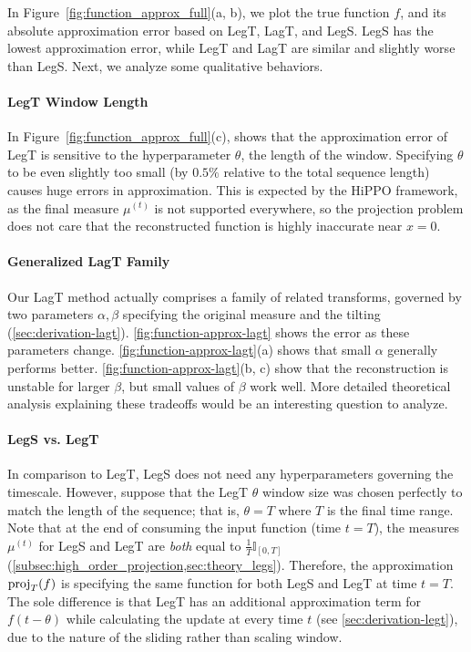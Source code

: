 \documentclass[../hippo.tex]{subfiles}
\begin{document}
In Figure~\ref{fig:function_approx_full}(a, b), we plot the true function $f$, and
its absolute approximation error based on LegT, LagT, and LegS.
LegS has the lowest approximation error, while LegT and LagT are similar and slightly worse than LegS.
Next, we analyze some qualitative behaviors.

\paragraph{LegT Window Length}

In Figure~\ref{fig:function_approx_full}(c), shows that the approximation error of
LegT is sensitive to the hyperparameter $\theta$, the length of the window.
Specifying $\theta$ to be even slightly too small (by $0.5\%$ relative to the total sequence length)
causes huge errors in approximation.
This is expected by the HiPPO framework, as the final measure $\mu^{(t)}$ is not supported everywhere, so the projection problem does not care that the reconstructed function is highly inaccurate near $x=0$.

\paragraph{Generalized LagT Family}
Our LagT method actually comprises a family of related transforms,
governed by two parameters $\alpha, \beta$ specifying the original measure and the tilting (\cref{sec:derivation-lagt}).
\cref{fig:function-approx-lagt} shows the error as these parameters change.
\cref{fig:function-approx-lagt}(a) shows that small $\alpha$ generally performs better.
\cref{fig:function-approx-lagt}(b, c) show that the reconstruction is unstable for larger $\beta$, but small values of $\beta$ work well.
More detailed theoretical analysis explaining these tradeoffs would be an interesting question to analyze.

\paragraph{LegS vs. LegT}

In comparison to LegT, LegS does not need any hyperparameters governing the timescale.
However, suppose that the LegT $\theta$ window size was chosen perfectly to match the length of the sequence;
that is, $\theta = T$ where $T$ is the final time range.
Note that at the end of consuming the input function (time $t = T$),
the measures $\mu^{(t)}$ for LegS and LegT are \emph{both} equal to $\frac{1}{T}\mathbb{I}_{[0,T]}$ (\cref{subsec:high_order_projection,sec:theory_legs}).
Therefore, the approximation $\operatorname{proj}_T(f)$ is specifying the same function for both LegS and LegT at time $t=T$.
The sole difference is that LegT has an additional approximation term for $f(t-\theta)$ while calculating the update at every time $t$ (see \cref{sec:derivation-legt}), due to the nature of the sliding rather than scaling window.
\end{document}
